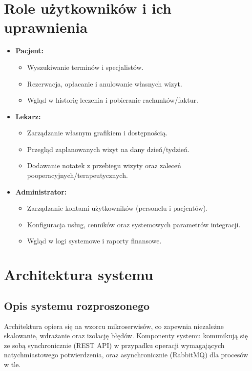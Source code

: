 \documentclass[12pt]{article}
\begin{document}
\section{Role użytkowników i ich uprawnienia}
\begin{itemize}
    \item \textbf{Pacjent:}
    \begin{itemize}
        \item Wyszukiwanie terminów i specjalistów.
        \item Rezerwacja, opłacanie i anulowanie własnych wizyt.
        \item Wgląd w historię leczenia i pobieranie rachunków/faktur.
    \end{itemize}
    \item \textbf{Lekarz:}
    \begin{itemize}
        \item Zarządzanie własnym grafikiem i dostępnością.
        \item Przegląd zaplanowanych wizyt na dany dzień/tydzień.
        \item Dodawanie notatek z przebiegu wizyty oraz zaleceń pooperacyjnych/terapeutycznych.
    \end{itemize}
    \item \textbf{Administrator:}
    \begin{itemize}
        \item Zarządzanie kontami użytkowników (personelu i pacjentów).
        \item Konfiguracja usług, cenników oraz systemowych parametrów integracji.
        \item Wgląd w logi systemowe i raporty finansowe.
    \end{itemize}
\end{itemize}

\section{Architektura systemu}
\subsection{Opis systemu rozproszonego}
Architektura opiera się na wzorcu mikroserwisów, co zapewnia niezależne skalowanie, wdrażanie oraz izolację błędów. Komponenty systemu komunikują się ze sobą synchronicznie (REST API) w przypadku operacji wymagających natychmiastowego potwierdzenia, oraz asynchronicznie (RabbitMQ) dla procesów w tle.
\end{document}
